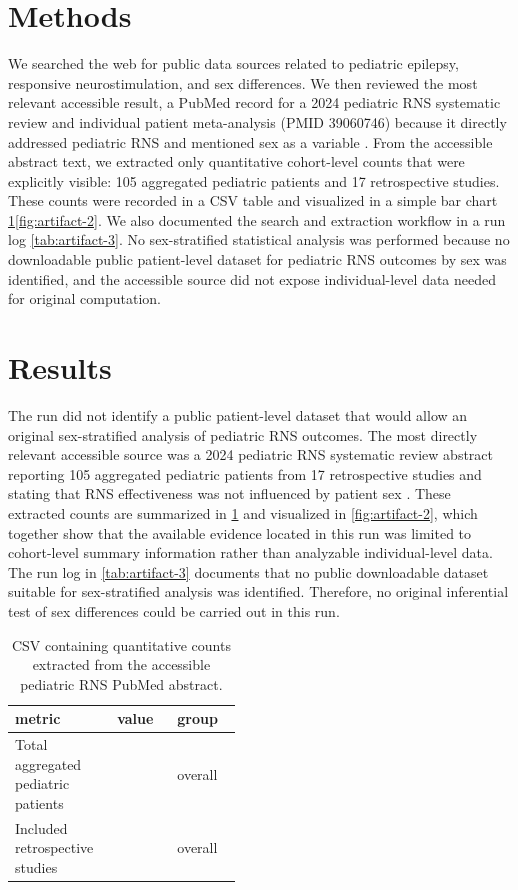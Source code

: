 \documentclass[11pt]{article}
\begin{document}
\section{Methods}
We searched the web for public data sources related to pediatric epilepsy, responsive neurostimulation, and sex differences. We then reviewed the most relevant accessible result, a PubMed record for a 2024 pediatric RNS systematic review and individual patient meta-analysis (PMID 39060746) because it directly addressed pediatric RNS and mentioned sex as a variable \cite{ref1}. From the accessible abstract text, we extracted only quantitative cohort-level counts that were explicitly visible: 105 aggregated pediatric patients and 17 retrospective studies. These counts were recorded in a CSV table and visualized in a simple bar chart \ref{tab:artifact-1}\ref{fig:artifact-2}. We also documented the search and extraction workflow in a run log \ref{tab:artifact-3}. No sex-stratified statistical analysis was performed because no downloadable public patient-level dataset for pediatric RNS outcomes by sex was identified, and the accessible source did not expose individual-level data needed for original computation.

\section{Results}
The run did not identify a public patient-level dataset that would allow an original sex-stratified analysis of pediatric RNS outcomes. The most directly relevant accessible source was a 2024 pediatric RNS systematic review abstract reporting 105 aggregated pediatric patients from 17 retrospective studies and stating that RNS effectiveness was not influenced by patient sex \cite{ref1}. These extracted counts are summarized in \ref{tab:artifact-1} and visualized in \ref{fig:artifact-2}, which together show that the available evidence located in this run was limited to cohort-level summary information rather than analyzable individual-level data. The run log in \ref{tab:artifact-3} documents that no public downloadable dataset suitable for sex-stratified analysis was identified. Therefore, no original inferential test of sex differences could be carried out in this run.

\begin{table}[tbp]
\centering
\caption{CSV containing quantitative counts extracted from the accessible pediatric RNS PubMed abstract.}
\label{tab:artifact-1}
\begin{tabular}{>{\raggedright\arraybackslash}p{0.15\linewidth}>{\raggedright\arraybackslash}p{0.15\linewidth}>{\raggedright\arraybackslash}p{0.15\linewidth}}
\toprule
metric & value & group \\
\midrule
Total aggregated pediatric patients & 105 & overall \\
Included retrospective studies & 17 & overall \\
\bottomrule
\end{tabular}
\end{table}
\end{document}
